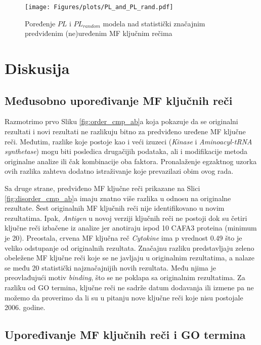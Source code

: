 \begin{figure}[th]
\hspace*{-3.0cm} 
\texttt{[image: Figures/plots/PL\_and\_PL\_rand.pdf]}
\caption {
  Poređenje $PL$ i $PL_{random}$ modela nad statistički značajnim predviđenim (ne)uređenim MF ključnim rečima
}
\label{fig:PLrand}
\end{figure}




\chapter{Diskusija} %

\label{Diskusija} %

\section{Međusobno upoređivanje MF ključnih reči}

Razmotrimo prvo Sliku \ref{fig:order_cmp_ab}a koja pokazuje da se originalni
rezultati i novi rezultati ne razlikuju bitno za predviđeno uređene MF ključne
reči. Međutim, razlike koje postoje kao i veći izuzeci (\textit{Kinase} i
\textit{Aminoacyl-tRNA synthetase})  mogu biti posledica drugačijih podataka,
ali i modifikacije metoda originalne analize ili čak kombinacije oba faktora.
Pronalaženje egzaktnog uzorka ovih razlika zahteva dodatno istraživanje koje
prevazilazi obim ovog rada.

Sa druge strane, predviđeno  MF ključne reči prikazane na
Slici \ref{fig:disorder_cmp_ab}a imaju znatno više razlika u odnosu na
originalne rezultate.  Šest originalnih MF ključnih reči nije identifikovano u
novim rezultatima. Ipak, \textit{Antigen} u novoj verziji ključnih reči ne
postoji dok su četiri ključne reči izbačene iz analize jer anotiraju ispod 10
CAFA3 proteina (minimum je 20).  Preostala, crvena MF ključna reč
\textit{Cytokine} ima p vrednost 0.49 što je veliko odstupanje od originalnih
rezultata. Značajnu razliku predstavljaju zeleno obeležene MF ključne reči koje
se ne javljaju u originalnim rezultatima, a nalaze se među 20 statistički
najznačajnijih novih rezultata. Među njima je preovlađujući motiv \textit{binding}, 
što se ne poklapa sa originalnim rezultatima. Za razliku od GO termina,
ključne reči ne sadrže datum dodavanja ili izmene pa ne možemo da proverimo da
li su u pitanju nove ključne reči koje nisu postojale 2006. godine.


\section{Upoređivanje MF ključnih reči i GO termina}

